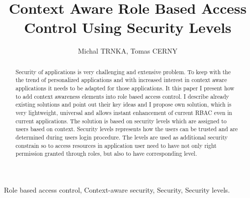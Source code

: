 \documentclass{poster15}
\begin{document}

%
\title{Context Aware Role Based Access Control Using Security Levels}
%

%
\author{Michal TRNKA, Tomas CERNY}
%


\maketitle


\begin{abstract}
Security of applications is very challenging and extensive problem. To keep with the the trend of personalized applications and with increased interest in context aware applications it needs to be adapted for those applications. It this paper I present how to add context awareness elements into role based access control. I describe already existing solutions and point out their key ideas and I propose own solution, which is very lightweight, universal and allows instant enhancement of current RBAC even in current applications. The solution is based on security levels which are assigned to users based on context. Security levels represents how the users can be trusted and are determined during users login procedure. The levels are used as additional security constrain so to access resources in application user need to have not only right permission granted through roles, but also to have corresponding level.
\end{abstract}


\begin{keywords}
Role based access control, Context-aware security, Security, Security levels.
\end{keywords}
\end{document}

